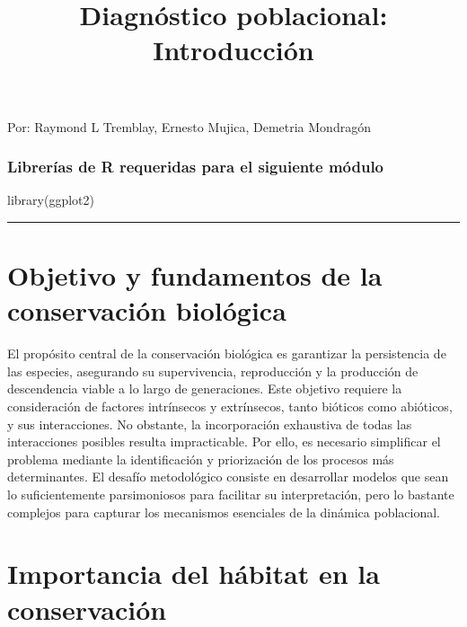 \documentclass[
  12pt,
  letterpaper,
]{book}
\title{Diagnóstico poblacional: Introducción}
\author{}
\date{}
\newenvironment{Shaded}{\begin{snugshade}}{\end{snugshade}}
\newcommand{\FunctionTok}[1]{\textcolor[rgb]{0.28,0.35,0.67}{#1}}
\newcommand{\NormalTok}[1]{\textcolor[rgb]{0.00,0.23,0.31}{#1}}
\renewcommand*\contentsname{Table of contents}
\newcommand\contentsname{Table of contents}
\begin{document}
\frontmatter
\maketitle

\renewcommand*\contentsname{Table of contents}
{
\hypersetup{linkcolor=}
\setcounter{tocdepth}{2}
\tableofcontents
}

\mainmatter
Por: Raymond L Tremblay, Ernesto Mujica, Demetria Mondragón

\subsection{Librerías de R requeridas para el siguiente
módulo}\label{libreruxedas-de-r-requeridas-para-el-siguiente-muxf3dulo}

\begin{Shaded}
\begin{Highlighting}[]
\FunctionTok{library}\NormalTok{(ggplot2)}
\end{Highlighting}
\end{Shaded}

\begin{center}\rule{0.5\linewidth}{0.5pt}\end{center}

\chapter{Objetivo y fundamentos de la conservación
biológica}\label{objetivo-y-fundamentos-de-la-conservaciuxf3n-bioluxf3gica}

El propósito central de la conservación biológica es garantizar la
persistencia de las especies, asegurando su supervivencia, reproducción
y la producción de descendencia viable a lo largo de generaciones. Este
objetivo requiere la consideración de factores intrínsecos y
extrínsecos, tanto bióticos como abióticos, y sus interacciones. No
obstante, la incorporación exhaustiva de todas las interacciones
posibles resulta impracticable. Por ello, es necesario simplificar el
problema mediante la identificación y priorización de los procesos más
determinantes. El desafío metodológico consiste en desarrollar modelos
que sean lo suficientemente parsimoniosos para facilitar su
interpretación, pero lo bastante complejos para capturar los mecanismos
esenciales de la dinámica poblacional.

\chapter{Importancia del hábitat en la
conservación}\label{importancia-del-huxe1bitat-en-la-conservaciuxf3n}
\end{document}

